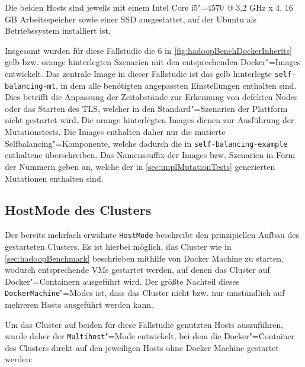 Die beiden Hosts sind jeweils mit einem Intel Core i5"=4570 @ 3,2 GHz x 4, 16 GB Arbeitsspeicher sowie einer SSD ausgestattet, auf der Ubuntu als Betriebssystem installiert ist.

Insgesamt wurden für diese Fallstudie die 6 in \cref{fig:hadoopBenchDockerInherits} gelb bzw. orange hinterlegten Szenarien mit den entsprechenden Docker"=Images entwickelt.
Das zentrale Image in dieser Fallstudie ist das gelb hinterlegte \texttt{self-balancing-mt}, in dem alle benötigten angepassten Einstellungen enthalten sind.
Dies betrifft \zB die Anpassung der Zeitabstände zur Erkennung von defekten Nodes oder das Starten des \gls{TLS}, welcher in den Standard"=Szenarien der Plattform nicht gestartet wird.
Die orange hinterlegten Images dienen zur Ausführung der  Mutationstests.
Die Images enthalten daher nur die mutierte Selfbalancing"=Komponente, welche dadurch die in \texttt{self-balancing-example} enthaltene überschreiben.
Das Namenssuffix der Images bzw. Szenarien in Form der Nummern geben an, welche der in \cref{sec:implMutationTests} generierten Mutationen enthalten sind.

\subsection{HostMode des Clusters}
\label{subsec:hostMode}

Der bereits mehrfach erwähnte \texttt{HostMode} beschreibt den prinzipiellen Aufbau des gestarteten Clusters.
Es ist hierbei möglich, das Cluster wie in \cref{sec:hadoopBenchmark} beschrieben mithilfe von Docker Machine zu starten, wodurch entsprechende VMs gestartet werden, auf denen das Cluster auf Docker"=Containern ausgeführt wird.
Der größte Nachteil dieses \texttt{DockerMachine}"=Modes ist, dass das Cluster nicht bzw. nur umständlich auf mehreren Hosts ausgeführt werden kann.

Um das Cluster auf beiden für diese Fallstudie genutzten Hosts auszuführen, wurde daher der \texttt{Multihost}"=Mode entwickelt, bei dem die Docker"=Container des Clusters direkt auf den jeweiligen Hosts ohne Docker Machine gestartet werden:

